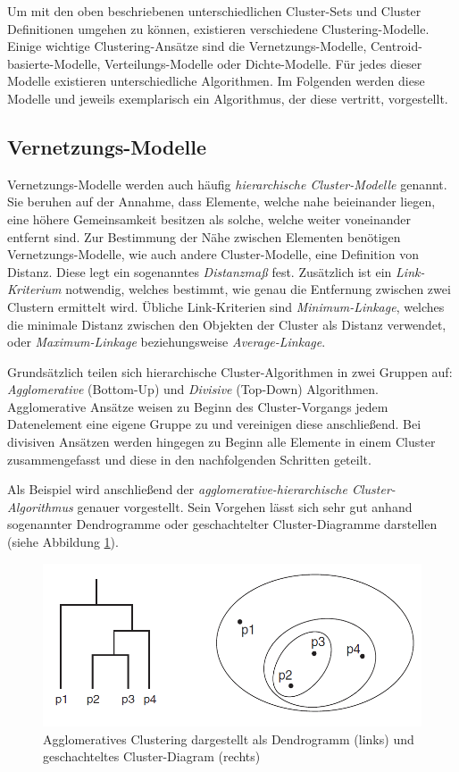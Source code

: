 Um mit den oben beschriebenen unterschiedlichen Cluster-Sets und Cluster Definitionen umgehen zu können,
existieren verschiedene Clustering-Modelle.
Einige wichtige Clustering-Ansätze sind die Vernetzungs-Modelle, Centroid-basierte-Modelle, Verteilungs-Modelle
oder Dichte-Modelle. Für jedes dieser Modelle existieren unterschiedliche Algorithmen. Im Folgenden werden
diese Modelle und jeweils exemplarisch ein Algorithmus, der diese vertritt, vorgestellt.

\subsection{Vernetzungs-Modelle}
\label{sec:grund_vernetzungs_clustering}

Vernetzungs-Modelle werden auch häufig \textit{hierarchische Cluster-Modelle} genannt. Sie beruhen auf
der Annahme, dass Elemente, welche nahe beieinander liegen, eine höhere Gemeinsamkeit besitzen als solche,
welche weiter voneinander entfernt sind. Zur Bestimmung der Nähe zwischen Elementen benötigen Vernetzungs-Modelle,
wie auch andere Cluster-Modelle, eine
Definition von Distanz. Diese legt ein sogenanntes \textit{Distanzmaß} fest. Zusätzlich ist ein \textit{Link-Kriterium} notwendig,
welches bestimmt, wie genau die Entfernung zwischen zwei Clustern ermittelt wird. Übliche Link-Kriterien
sind \textit{Minimum-Linkage}, welches die minimale Distanz zwischen den Objekten der Cluster als Distanz verwendet,
oder \textit{Maximum-Linkage} beziehungsweise \textit{Average-Linkage}. \cite[]{Jain1999, GeorgeSeif2018}


Grundsätzlich teilen sich hierarchische Cluster-Algorithmen in zwei Gruppen auf:
\textit{Agglomerative} (Bottom-Up) und \textit{Divisive} (Top-Down) Algorithmen.
Agglomerative Ansätze weisen zu Beginn des Cluster-Vorgangs jedem Datenelement eine eigene Gruppe zu und vereinigen
diese anschließend.
Bei divisiven Ansätzen werden hingegen zu Beginn alle Elemente in einem Cluster zusammengefasst und
diese in den nachfolgenden Schritten geteilt.

Als Beispiel wird anschließend der \textit{agglomerative-hierarchische Cluster-Algorithmus} genauer vorgestellt.
Sein Vorgehen lässt sich sehr gut anhand sogenannter Dendrogramme oder geschachtelter Cluster-Diagramme darstellen
(siehe Abbildung \ref{fig:grund_agglo_clustering}).

\begin{figure}[H]
    \centering
    \includegraphics[width=0.7\linewidth]{resources/img/grundlagen/agglo_clustering}
    \caption{Agglomeratives Clustering dargestellt als Dendrogramm (links) und geschachteltes Cluster-Diagram (rechts)}
    \label{fig:grund_agglo_clustering}
\end{figure}

